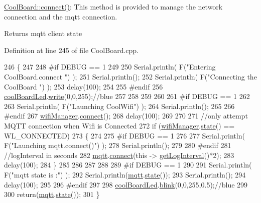 \hyperlink{class_cool_board_a519de78b807f8ec6463ff484eb925918}{Cool\+Board\+::connect()}\+: This method is provided to manage the network connection and the mqtt connection.

\begin{DoxyReturn}{Returns}
mqtt client state 
\end{DoxyReturn}


Definition at line 245 of file Cool\+Board.\+cpp.


\begin{DoxyCode}
246 \{
247 
248 \textcolor{preprocessor}{#if DEBUG == 1  }
249 
250     Serial.println( F(\textcolor{stringliteral}{"Entering CoolBoard.connect "}) );
251     Serial.println();
252     Serial.println( F(\textcolor{stringliteral}{"Connecting the CoolBoard  "}) );
253     delay(100);
254 
255 \textcolor{preprocessor}{#endif}
256     \hyperlink{class_cool_board_a1b1d3c684a5baa56b08486e192fd8e97}{coolBoardLed}.\hyperlink{class_cool_board_led_a30fadd4cbec17ceea428bf7a32207e87}{write}(0,0,255);\textcolor{comment}{//blue}
257 
258     
259             
260     
261 \textcolor{preprocessor}{#if DEBUG == 1      }
262 
263     Serial.println( F(\textcolor{stringliteral}{"Launching CoolWifi"}) );
264     Serial.println();
265 
266 \textcolor{preprocessor}{#endif}
267     \hyperlink{class_cool_board_acd88e6003606b47479ebba81e4aceeca}{wifiManager}.\hyperlink{class_cool_wifi_ad060353050f40d032a2dbf9e54a768bf}{connect}();
268     delay(100);
269 
270 
271     \textcolor{comment}{//only attempt MQTT connection when Wifi is Connected}
272     \textcolor{keywordflow}{if} (\hyperlink{class_cool_board_acd88e6003606b47479ebba81e4aceeca}{wifiManager}.\hyperlink{class_cool_wifi_a1c7b4d82a4098d346e7593dce92039fa}{state}() == WL\_CONNECTED)
273     \{
274 
275 \textcolor{preprocessor}{    #if DEBUG == 1  }
276     
277         Serial.println( F(\textcolor{stringliteral}{"Launching mqtt.connect()"}) );
278         Serial.println();
279     
280 \textcolor{preprocessor}{    #endif  }
281         \textcolor{comment}{//logInterval in seconds}
282         \hyperlink{class_cool_board_a2399f44d7c23c1149a335cb3b46d90f1}{mqtt}.\hyperlink{class_cool_m_q_t_t_a50075d0ab23a327ab897fd6adad20eda}{connect}(\textcolor{keyword}{this} -> \hyperlink{class_cool_board_a7508e029f2ee17bb747ffab599285e0d}{getLogInterval}()*2);
283         delay(100);
284     \}
285     
286         
287     
288     
289 \textcolor{preprocessor}{#if DEBUG == 1}
290 
291     Serial.println( F(\textcolor{stringliteral}{"mqtt state is :"}) );
292     Serial.println(\hyperlink{class_cool_board_a2399f44d7c23c1149a335cb3b46d90f1}{mqtt}.\hyperlink{class_cool_m_q_t_t_a5d003307eff78efbd585e42b43b72b6d}{state}());
293     Serial.println();
294     delay(100);
295 
296 \textcolor{preprocessor}{#endif}
297 
298     \hyperlink{class_cool_board_a1b1d3c684a5baa56b08486e192fd8e97}{coolBoardLed}.\hyperlink{class_cool_board_led_a96e1ea13003eee34c9dbcef340404426}{blink}(0,0,255,0.5);\textcolor{comment}{//blue}
299 
300     \textcolor{keywordflow}{return}(\hyperlink{class_cool_board_a2399f44d7c23c1149a335cb3b46d90f1}{mqtt}.\hyperlink{class_cool_m_q_t_t_a5d003307eff78efbd585e42b43b72b6d}{state}());
301 \}
\end{DoxyCode}
